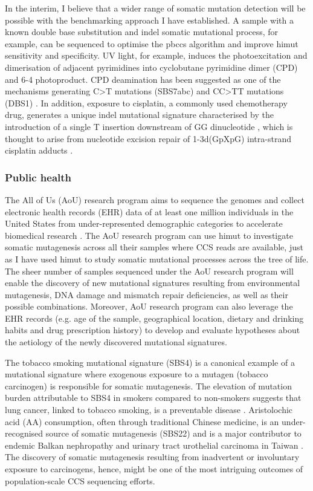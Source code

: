 In the interim, I believe that a wider range of somatic mutation detection will be possible with the benchmarking approach I have established. A sample with a known double base substitution and indel somatic mutational process, for example, can be sequenced to optimise the pbccs algorithm and improve himut sensitivity and specificity. UV light, for example, induces the photoexcitation and dimerisation of adjacent pyrimidines into cyclobutane pyrimidine dimer (CPD) and 6-4 photoproduct. CPD deamination has been suggested as one of the mechanisms generating C>T mutations (SBS7abc) and CC>TT mutations (DBS1) \cite{Jin2021-ae}. In addition, exposure to cisplatin, a commonly used chemotherapy drug, generates a unique indel mutational signature characterised by the introduction of a single T insertion downstream of GG dinucleotide \cite{Szikriszt2016-ed}, which is thought to arise from nucleotide excision repair of 1-3d(GpXpG) intra-strand cisplatin adducts \cite{Zamble1996-mx}. 

\subsubsection{Public health}

The All of Us (AoU) research program aims to sequence the genomes and collect electronic health records (EHR) data of at least one million individuals in the United States from under-represented demographic categories to accelerate biomedical research \cite{AoU2019}. The AoU research program can use himut to investigate somatic mutagenesis across all their samples where CCS reads are available, just as I have used himut to study somatic mutational processes across the tree of life. The sheer number of samples sequenced under the AoU research program will enable the discovery of new mutational signatures resulting from environmental mutagenesis, DNA damage and mismatch repair deficiencies, as well as their possible combinations. Moreover, AoU research program can also leverage the EHR records (e.g. age of the sample, geographical location, dietary and drinking habits and drug prescription history) to develop and evaluate hypotheses about the aetiology of the newly discovered mutational signatures.

The tobacco smoking mutational signature (SBS4) is a canonical example of a mutational signature where exogenous exposure to a mutagen (tobacco carcinogen) is responsible for somatic mutagenesis. The elevation of mutation burden attributable to SBS4 in smokers compared to non-smokers suggests that lung cancer, linked to tobacco smoking, is a preventable disease \cite{Alexandrov2016-uw}. Aristolochic acid (AA) consumption, often through traditional Chinese medicine, is an under-recognised source of somatic mutagenesis (SBS22) and is a major contributor to endemic Balkan nephropathy \cite{Grollman2007-rh} and urinary tract urothelial carcinoma in Taiwan \cite{Chen2012-vh}. The discovery of somatic mutagenesis resulting from inadvertent or involuntary exposure to carcinogens, hence, might be one of the most intriguing outcomes of population-scale CCS sequencing efforts. 

